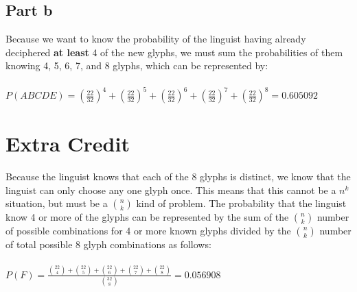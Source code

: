 \documentclass[11pt]{article}
\begin{document}
\subsection*{Part b}
\noindent
Because we want to know the probability of the linguist having already deciphered \textbf{at least} 4 of the new glyphs, we must sum the probabilities of them knowing 4, 5, 6, 7, and 8 glyphs, which can be represented by:\\\\
$ P(ABCDE) = ( \frac{22}{32} )^{4} + ( \frac{22}{32} )^{5} + ( \frac{22}{32} )^{6} + ( \frac{22}{32} )^{7} + ( \frac{22}{32} )^{8} = 0.605092 $

\section*{Extra Credit}
\noindent
Because the linguist knows that each of the 8 glyphs is distinct, we know that the linguist can only choose any one glyph once. This means that this cannot be a $ n^{k} $ situation, but must be a $ {{n}\choose{k}} $ kind of problem. The probability that the linguist know 4 or more of the glyphs can be represented by the sum of the $ {{n}\choose{k}} $ number of possible combinations for 4 or more known glyphs divided by the $ {{n}\choose{k}} $ number of total possible 8 glyph combinations as follows:\\\\
$ P(F) = \frac{{{22}\choose{4}}+{{22}\choose{5}}+{{22}\choose{6}}+{{22}\choose{7}}+{{22}\choose{8}}}{{{32}\choose{8}}} = 0.056908 $
\end{document}
